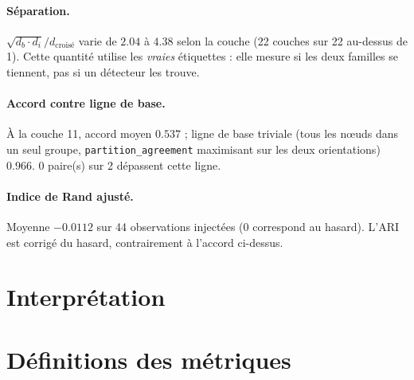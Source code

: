 \documentclass[11pt,a4paper]{article}
\begin{document}
\paragraph{Séparation.} $\sqrt{d_b \cdot d_i} / d_{\text{croisé}}$ varie
de $2.04$ à $4.38$ selon la couche
(22 couches sur 22 au-dessus de 1).
Cette quantité utilise les \emph{vraies} étiquettes : elle mesure si les deux
familles se tiennent, pas si un détecteur les trouve.



\paragraph{Accord contre ligne de base.} À la couche 11, accord moyen
$0.537$ ; ligne de base triviale (tous les n\oe uds dans
un seul groupe, \texttt{partition\_agreement} maximisant sur les deux
orientations) $0.966$.
0 paire(s) sur 2 dépassent cette ligne.



\paragraph{Indice de Rand ajusté.} Moyenne $-0.0112$ sur
44 observations injectées (0 correspond au hasard). L'ARI est corrigé
du hasard, contrairement à l'accord ci-dessus.


\section{Interprétation}



\section{Définitions des métriques}
\end{document}
